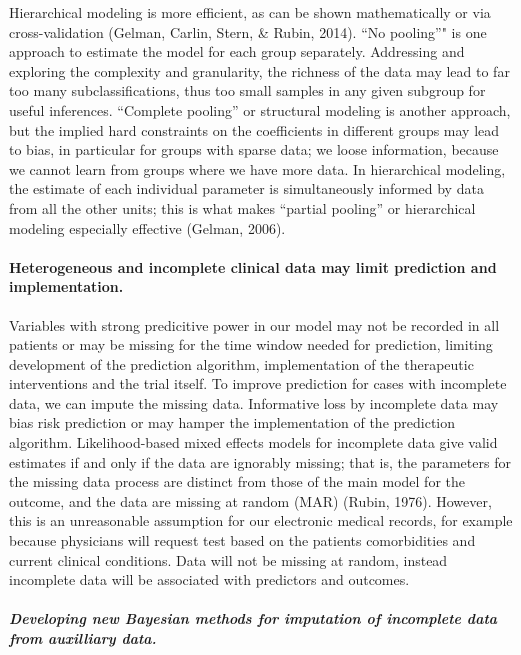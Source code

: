 \documentclass[]{article}
\begin{document}
Hierarchical modeling is more efficient, as can be shown mathematically
or via cross-validation (Gelman, Carlin, Stern, \& Rubin, 2014). ``No
pooling''" is one approach to estimate the model for each group
separately. Addressing and exploring the complexity and granularity, the
richness of the data may lead to far too many subclassifications, thus
too small samples in any given subgroup for useful inferences.
``Complete pooling'' or structural modeling is another approach, but the
implied hard constraints on the coefficients in different groups may
lead to bias, in particular for groups with sparse data; we loose
information, because we cannot learn from groups where we have more
data. In hierarchical modeling, the estimate of each individual
parameter is simultaneously informed by data from all the other units;
this is what makes ``partial pooling'' or hierarchical modeling
especially effective (Gelman, 2006).

\paragraph{Heterogeneous and incomplete clinical data may limit
prediction and
implementation.}\label{heterogeneous-and-incomplete-clinical-data-may-limit-prediction-and-implementation.}

Variables with strong predicitive power in our model may not be recorded
in all patients or may be missing for the time window needed for
prediction, limiting development of the prediction algorithm,
implementation of the therapeutic interventions and the trial itself. To
improve prediction for cases with incomplete data, we can impute the
missing data. Informative loss by incomplete data may bias risk
prediction or may hamper the implementation of the prediction algorithm.
Likelihood-based mixed effects models for incomplete data give valid
estimates if and only if the data are ignorably missing; that is, the
parameters for the missing data process are distinct from those of the
main model for the outcome, and the data are missing at random (MAR)
(Rubin, 1976). However, this is an unreasonable assumption for our
electronic medical records, for example because physicians will request
test based on the patients comorbidities and current clinical
conditions. Data will not be missing at random, instead incomplete data
will be associated with predictors and outcomes.

\subparagraph{Developing new Bayesian methods for imputation of
incomplete data from auxilliary
data.}\label{developing-new-bayesian-methods-for-imputation-of-incomplete-data-from-auxilliary-data.}
\end{document}
